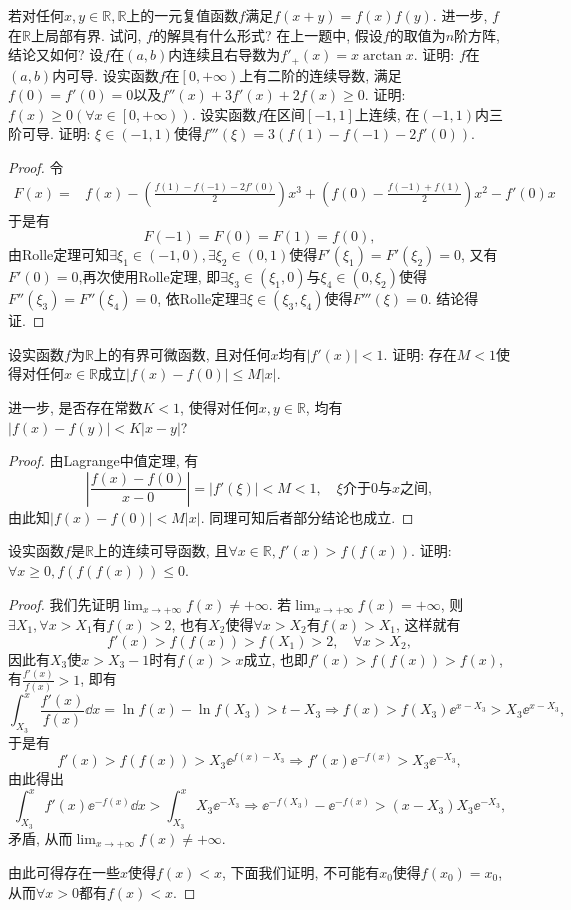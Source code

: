 \begin{quizb}
\woe 若对任何\(x,y\in\mathbb{R},\mathbb{R}\)上的一元复值函数\(f\)满足\(f(x+y)=f(x)f(y)\). 进一步, \(f\)在\(\mathbb{R}\)上局部有界. 试问, \(f\)的解具有什么形式?
\woe 在上一题中, 假设\(f\)的取值为\(n\)阶方阵, 结论又如何?
\woe 设\(f\)在\((a,b)\)内连续且右导数为\(f'_+(x)=x\arctan x\). 证明: \(f\)在\((a,b)\)内可导.
\woe 设实函数\(f\)在\(\left[0,+\infty\right)\)上有二阶的连续导数, 满足\(f(0)=f'(0)=0\)以及\(f''(x)+3f'(x)+2f(x)\geqslant 0\). 证明: \(f(x)\geqslant 0\left(\forall x\in \left[0,+\infty\right)\right)\).
\woe 设实函数\(f\)在区间\([-1,1]\)上连续, 在\((-1,1)\)内三阶可导. 证明: \(\xi\in(-1,1)\)使得\(f'''(\xi)=3\left(f(1)-f(-1)-2f'(0)\right)\).
\begin{proof}
令\[\begin{split}
F(x)=&f(x)-\left(\frac{f(1)-f(-1)-2f'(0)}{2}\right)x^3+\left(f(0)-\frac{f(-1)+f(1)}{2}\right)x^2-f'(0)x
\end{split}\]于是有\[F(-1)=F(0)=F(1)=f(0),\]由Rolle定理可知\(\exists \xi_1\in(-1,0),\exists \xi_2\in(0,1)\)使得\(F'(\xi_1)=F'(\xi_2)=0\), 又有\(F'(0)=0\),再次使用Rolle定理, 即\(\exists \xi_3\in(\xi_1,0)\)与\(\xi_4\in(0,\xi_2)\)使得\(F''(\xi_3)=F''(\xi_4)=0\), 依Rolle定理\(\exists \xi\in(\xi_3,\xi_4)\)使得\(F'''(\xi)=0\). 结论得证.
\end{proof}
\woe 设实函数\(f\)为\(\mathbb{R}\)上的有界可微函数, 且对任何\(x\)均有\(|f'(x)|<1.\) 证明: 存在\(M<1\)使得对任何\(x\in\mathbb{R}\)成立\(|f(x)-f(0)|\leqslant M|x|\).

进一步, 是否存在常数\(K<1\), 使得对任何\(x,y\in\mathbb{R}\), 均有\(|f(x)-f(y)|<K|x-y|\)?
\begin{proof}
由Lagrange中值定理, 有\[\left|\frac{f(x)-f(0)}{x-0}\right|=|f'(\xi)|<M<1,\quad \xi\text{介于\(0\)与\(x\)之间},\]由此知\(|f(x)-f(0)|<M|x|\). 同理可知后者部分结论也成立.
\end{proof}
\woe 设实函数\(f\)是\(\mathbb{R}\)上的连续可导函数, 且\(\forall x\in\mathbb{R}, f'(x)>f\left(f(x)\right)\). 证明: \(\forall x\geqslant 0,f\left(f\left(f(x)\right)\right)\leqslant 0\).
\begin{proof}
我们先证明\(\lim_{x\rightarrow+\infty}f(x)\ne +\infty\). 若\(\lim_{x\rightarrow+\infty}f(x)= +\infty\), 则\(\exists X_1,\forall x>X_1\)有\(f(x)>2\), 也有\(X_2\)使得\(\forall x>X_2\)有\(f(x)>X_1\), 这样就有\[f'(x)>f\left(f(x)\right)>f(X_1)>2,\quad \forall x>X_2,\]因此有\(X_3\)使\(x>X_3-1\)时有\(f(x)>x\)成立, 也即\(f'(x)>f\left(f(x)\right)>f(x)\), 有\(\frac{f'(x)}{f(x)}>1\), 即有\[\int_{X_3}^{x}\frac{f'(x)}{f(x)}\dd x=\ln f(x)-\ln f(X_3)>t-X_3\Rightarrow f(x)>f(X_3)\ee^{x-X_3}>X_3\ee^{x-X_3},\]于是有\[f'(x)>f\left(f(x)\right)>X_3\ee^{f(x)-X_3}\Rightarrow f'(x)\ee^{-f(x)}>X_3\ee^{-X_3},\]由此得出\[\int_{X_3}^{x}f'(x)\ee^{-f(x)}\dd x>\int_{X_3}^{x}X_3\ee^{-X_3}\Rightarrow \ee^{-f(X_3)}-\ee^{-f(x)}>(x-X_3)X_3\ee^{-X_3},\]矛盾, 从而\(\lim_{x\rightarrow+\infty}f(x)\ne +\infty\).

由此可得存在一些\(x\)使得\(f(x)<x\), 下面我们证明, 不可能有\(x_0\)使得\(f(x_0)=x_0\), 从而\(\forall x>0\)都有\(f(x)<x\).
\end{proof}


\end{quizb}
